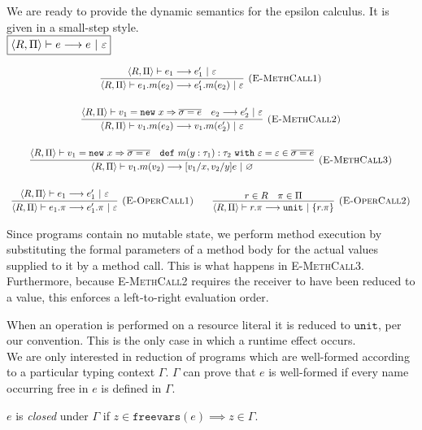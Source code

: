 \documentclass[a4paper,UKenglish]{lipics-v2016}
\newcommand{\kw}[1]{\mathtt{ #1 }~}
\newcommand{\kwa}[1]{\mathtt{ #1 }}
\newcommand{\newbasic}[0]{
	\kwa{new}~x \Rightarrow \overline{\sigma = e}
}
\newcommand{\singlestep}[0]{ \longrightarrow }
\newcommand{\rctx}[0]{ \langle R, \Pi \rangle }
\begin{document}
We are ready to provide the dynamic semantics for the epsilon calculus. It is given in a small-step style.\\

\noindent
$\fbox{$\rctx \vdash e \singlestep e~|~\varepsilon$}$

\[
\begin{array}{c}
\infer[\textsc{(E-MethCall1)}]
	{\rctx \vdash e_1.m(e_2) \singlestep e_1'.m(e_2)~|~\varepsilon}
	{\rctx \vdash e_1 \singlestep e_1'~|~\varepsilon} \\[4ex]

\infer[\textsc{(E-MethCall2)}]
	{\rctx \vdash v_1.m(e_2) \singlestep v_1.m(e_2')~|~\varepsilon}
	{\rctx \vdash v_1 = \newbasic & e_2 \singlestep e_2'~|~\varepsilon}\\[4ex]
	
\infer[\textsc{(E-MethCall3)}]
	{\rctx \vdash v_1.m(v_2) \singlestep [v_1/x, v_2/y]e~|~\varnothing}
	{\rctx \vdash v_1 = \newbasic & \kw{def} m(y: \tau_1): \tau_2~\kw{with} \varepsilon = \varepsilon \in \overline{\sigma = e}}\\[4ex]
	
\infer[\textsc{(E-OperCall1)}]
	{\rctx \vdash e_1.\pi \singlestep e_1'.\pi~|~\varepsilon}
	{\rctx \vdash e_1 \singlestep e_1'~|~\varepsilon}
	
~~~~~~

\infer[\textsc{(E-OperCall2)}]
	{\rctx \vdash r.\pi \singlestep \kwa{unit}~|~\{ r.\pi \}}
	{r \in R  & \pi \in \Pi}
	
	
\end{array}
\]

\noindent
Since programs contain no mutable state, we perform method execution by substituting the formal parameters of a method body for the actual values supplied to it by a method call. This is what happens in \textsc{E-MethCall3}. Furthermore, because \textsc{E-MethCall2} requires the receiver to have been reduced to a value, this enforces a left-to-right evaluation order.

When an operation is performed on a resource literal it is reduced to $\kwa{unit}$, per our convention. This is the only case in which a runtime effect occurs.\\

\noindent
We are only interested in reduction of programs which are well-formed according to a particular typing context $\Gamma$. $\Gamma$ can prove that $e$ is well-formed if every name occurring free in $e$ is defined in $\Gamma$. 

\begin{definition}
$e$ is \textit{closed} under $\Gamma$ if $z \in \kwa{freevars}(e) \implies z \in \Gamma$.
\end{definition}
\end{document}
